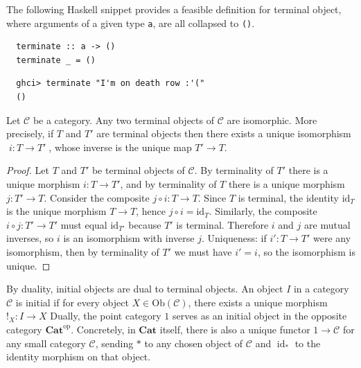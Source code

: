 \begin{example} The following Haskell snippet provides a feasible definition for terminal object, where arguments of a given type \texttt{a}, are all collapsed to \texttt{()}.
\begin{verbatim}  
  terminate :: a -> ()
  terminate _ = ()
\end{verbatim}
\begin{verbatim}
  ghci> terminate "I'm on death row :'("
  ()
\end{verbatim}
\end{example}

\begin{proposition}
Let $\mathcal{C}$ be a category. Any two terminal objects of $\mathcal{C}$ are isomorphic.
More precisely, if $T$ and $T'$ are terminal objects then there exists a unique isomorphism
$\;i:T\to T'\;$, whose inverse is the unique map $T'\to T$.
\end{proposition}

\begin{proof}
  Let $T$ and $T'$ be terminal objects of $\mathcal{C}$. By terminality of $T'$ there is a unique morphism
  \(
  i : T \to T'
  \),
  and by terminality of $T$ there is a unique morphism
  \(
  j : T' \to T.
  \)
  Consider the composite $j\circ i : T \to T$. Since $T$ is terminal, the identity $\mathrm{id}_T$ is the unique morphism $T\to T$, hence
  \(
    j\circ i = \mathrm{id}_T.
  \)
  Similarly, the composite $i\circ j : T' \to T'$ must equal $\mathrm{id}_{T'}$ because $T'$ is terminal. Therefore $i$ and $j$ are mutual inverses, so $i$ is an isomorphism with inverse $j$. Uniqueness: if $i':T\to T'$ were any isomorphism, then by terminality of $T'$ we must have $i'=i$, so the isomorphism is unique.
\end{proof}



\begin{definition}
  By duality, initial objects are dual to terminal objects.
  An object $I$ in a category $\mathcal{C}$ is initial if for every object 
  $X \in \text{Ob}(\mathcal{C})$, there exists a unique morphism
  \(
    !_X : I \to X
  \)
  Dually, the point category $1$ serves as an initial object in the opposite category
  $\mathbf{Cat}^{\mathrm{op}}$. Concretely, in $\mathbf{Cat}$ itself,
  there is also a unique functor
  \(
    1 \to \mathcal{C}
  \)
  for any small category $\mathcal{C}$, sending $*$ to any chosen object of $\mathcal{C}$
  and $\operatorname{id}_*$ to the identity morphism on that object.
\end{definition}
